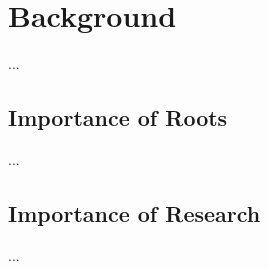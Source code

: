 \section{Background}

...

\subsection{Importance of Roots}

...

\subsection{Importance of Research}

...

